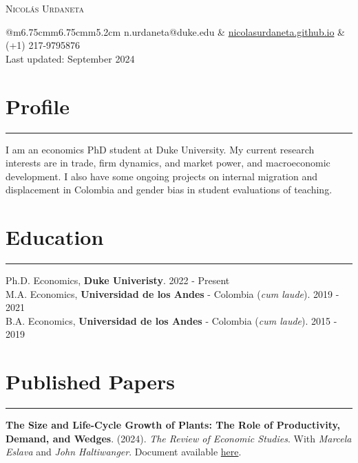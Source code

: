 \documentclass[12pt, letterpaper]{article}
\begin{document}
 

\begin{center}
{\Huge \textsc{Nicolás Urdaneta}}
\vspace*{5mm}

\begin{tabular}{@{}m{6.75cm}m{6.75cm}m{5.2cm}}
\noindent n.urdaneta@duke.edu & \href{nicolasurdaneta.github.io}{nicolasurdaneta.github.io} & (+1) 217-9795876 \\
Last updated: September 2024
\end{tabular}
\vspace*{-7mm}

\end{center}
\section*{Profile}
\vspace*{-8mm}
\noindent \rule{\linewidth}{0.2mm}
\noindent I am an economics PhD student at Duke University. My current research interests are in trade, firm dynamics, and market power, and macroeconomic development. I also have some ongoing projects on internal migration and displacement in Colombia and gender bias in student evaluations of teaching. 

\vspace*{-4mm}

\section*{Education}
\vspace*{-8mm}
\noindent \rule{\linewidth}{0.2mm}
\noindent
Ph.D. Economics, \textbf{Duke Univeristy}. \hfill 2022 - Present \\
M.A. Economics, \textbf{Universidad de los Andes} - Colombia (\textit{cum laude}). \hfill 2019 - 2021 \\
B.A. Economics, \textbf{Universidad de los Andes} - Colombia (\textit{cum laude}). \hfill 2015 - 2019

\vspace*{-2mm}

\section*{Published Papers}
\vspace*{-8mm}
\noindent \rule{\linewidth}{0.2mm}
\noindent \textbf{The Size and Life-Cycle Growth of Plants: The Role of Productivity, Demand, and Wedges}. (2024). \textit{The Review of Economic Studies}.   With \textit{Marcela Eslava} and \textit{John Haltiwanger}. Document available \href{https://academic.oup.com/restud/advance-article/doi/10.1093/restud/rdad029/7054272?login=true}{here}. \\ [-3mm]
\end{document}
